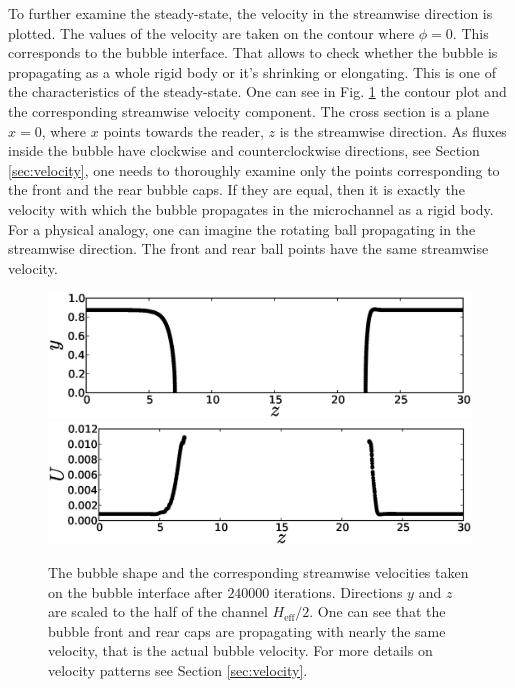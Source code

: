\documentclass[preprint,12pt]{elsarticle}
\begin{document}
To further examine the steady-state, the velocity in the streamwise direction is plotted. The values
of the velocity are taken on the contour where $\phi=0$. This corresponds
 to the bubble interface. That allows to check whether the bubble is propagating as a whole rigid
body or it's shrinking or elongating. This is one of the characteristics of the steady-state.  One
can see in Fig. \ref{fig:velocity:contour} the contour plot and the
corresponding streamwise velocity
component. The cross section is a plane $x=0$, where $x$ points
towards the reader, $z$ is the streamwise direction. As fluxes inside the bubble have
clockwise and counterclockwise directions, see Section \ref{sec:velocity}, one needs to thoroughly
examine only the points corresponding to the front and the rear bubble caps. If they are equal, then
it is exactly the velocity with which the bubble propagates in the microchannel as a rigid body.
For a physical analogy, one can imagine the rotating ball propagating in the streamwise direction.
The front and rear ball points have the same streamwise velocity. 
\begin{figure}[ht]
\includegraphics[width=\textwidth]{Figures/velocity_interface_contour.eps}\\
\includegraphics[width=\textwidth]{Figures/velocity_interface_values.eps}\\
\caption{The bubble shape and the corresponding streamwise velocities taken on the bubble
interface after $240000$ iterations. Directions $y$ and $z$ are scaled to the half of the channel
$H_{\mathrm{eff}}/2$. One can see that the bubble front and rear caps are propagating with nearly
the
same velocity, that is the actual bubble velocity. For more details on velocity patterns
see Section \ref{sec:velocity}. \label{fig:velocity:contour}}
\end{figure}
\end{document}
